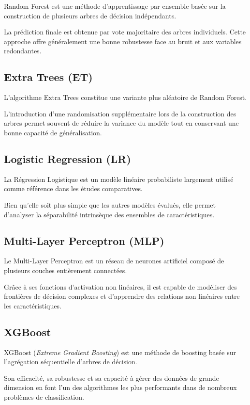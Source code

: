 Random Forest est une méthode d'apprentissage par ensemble basée sur la construction de
plusieurs arbres de décision indépendants.

La prédiction finale est obtenue par vote majoritaire des arbres individuels. Cette approche
offre généralement une bonne robustesse face au bruit et aux variables redondantes.

\subsection{Extra Trees (ET)}

L'algorithme Extra Trees constitue une variante plus aléatoire de Random Forest.

L'introduction d'une randomisation supplémentaire lors de la construction des arbres permet
souvent de réduire la variance du modèle tout en conservant une bonne capacité de
généralisation.

\subsection{Logistic Regression (LR)}

La Régression Logistique est un modèle linéaire probabiliste largement utilisé comme
référence dans les études comparatives.

Bien qu'elle soit plus simple que les autres modèles évalués, elle permet d'analyser la
séparabilité intrinsèque des ensembles de caractéristiques.

\subsection{Multi-Layer Perceptron (MLP)}

Le Multi-Layer Perceptron est un réseau de neurones artificiel composé de plusieurs couches
entièrement connectées.

Grâce à ses fonctions d'activation non linéaires, il est capable de modéliser des frontières
de décision complexes et d'apprendre des relations non linéaires entre les caractéristiques.

\subsection{XGBoost}

XGBoost (\emph{Extreme Gradient Boosting}) est une méthode de boosting basée sur l'agrégation
séquentielle d'arbres de décision.

Son efficacité, sa robustesse et sa capacité à gérer des données de grande dimension en font
l'un des algorithmes les plus performants dans de nombreux problèmes de classification.

